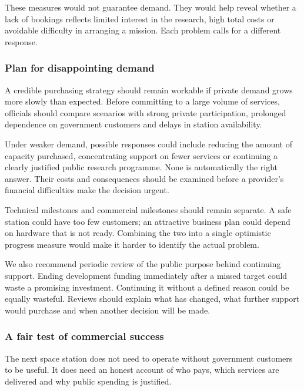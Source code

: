 \documentclass[11pt,letterpaper]{article}
\begin{document}
These measures would not guarantee demand. They would help reveal
whether a lack of bookings reflects limited interest in the research,
high total costs or avoidable difficulty in arranging a mission. Each
problem calls for a different response.

\hypertarget{plan-for-disappointing-demand}{%
\subsubsection{Plan for disappointing
demand}\label{plan-for-disappointing-demand}}

A credible purchasing strategy should remain workable if private demand
grows more slowly than expected. Before committing to a large volume of
services, officials should compare scenarios with strong private
participation, prolonged dependence on government customers and delays
in station availability.

Under weaker demand, possible responses could include reducing the
amount of capacity purchased, concentrating support on fewer services or
continuing a clearly justified public research programme. None is
automatically the right answer. Their costs and consequences should be
examined before a provider's financial difficulties make the decision
urgent.

Technical milestones and commercial milestones should remain separate. A
safe station could have too few customers; an attractive business plan
could depend on hardware that is not ready. Combining the two into a
single optimistic progress measure would make it harder to identify the
actual problem.

We also recommend periodic review of the public purpose behind
continuing support. Ending development funding immediately after a
missed target could waste a promising investment. Continuing it without
a defined reason could be equally wasteful. Reviews should explain what
has changed, what further support would purchase and when another
decision will be made.

\hypertarget{a-fair-test-of-commercial-success}{%
\subsubsection{A fair test of commercial
success}\label{a-fair-test-of-commercial-success}}

The next space station does not need to operate without government
customers to be useful. It does need an honest account of who pays,
which services are delivered and why public spending is justified.
\end{document}

